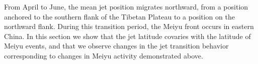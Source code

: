 \documentclass[draft,grl]{AGUTeX}
\begin{document}
\begin{article}

	

	
		

From April to June, the mean jet position migrates northward, from a position anchored to the southern flank of the Tibetan Plateau to a position on the northward flank. During this transition period, the Meiyu front occurs in eastern China. In this section we show that the jet latitude covaries with the latitude of Meiyu events, and that we observe changes in the jet transition behavior corresponding to changes in Meiyu activity demonstrated above. 




\end{article}
\end{document}
